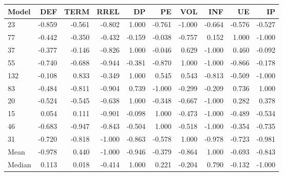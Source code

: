 \begin{table}
\centering
\label{tab:Shapley_loss_standardised_10_50}
\begin{tabular}{lrrrrrrrrr}
\toprule
 Model &    DEF &   TERM &   RREL &     DP &     PE &    VOL &    INF &     UE &     IP \\
\midrule
    23 & -0.859 & -0.561 & -0.802 &  1.000 & -0.761 & -1.000 & -0.664 & -0.576 & -0.527 \\
    77 & -0.442 & -0.350 & -0.432 & -0.159 & -0.038 & -0.757 &  0.152 &  1.000 & -1.000 \\
    37 & -0.377 & -0.146 & -0.826 &  1.000 & -0.046 &  0.629 & -1.000 &  0.460 & -0.092 \\
    55 & -0.740 & -0.688 & -0.944 & -0.381 & -0.870 &  1.000 & -1.000 & -0.866 & -0.178 \\
   132 & -0.108 &  0.833 & -0.349 &  1.000 &  0.545 &  0.543 & -0.813 & -0.509 & -1.000 \\
    83 & -0.484 & -0.811 & -0.904 &  0.739 & -1.000 & -0.299 & -0.209 &  0.736 &  1.000 \\
    20 & -0.524 & -0.545 & -0.638 &  1.000 & -0.348 & -0.667 & -1.000 &  0.282 &  0.378 \\
    15 &  0.054 &  0.111 & -0.901 & -0.098 &  1.000 & -0.473 & -1.000 & -0.489 & -0.534 \\
    46 & -0.683 & -0.947 & -0.843 & -0.504 &  1.000 & -0.518 & -1.000 & -0.354 & -0.735 \\
    31 & -0.720 & -0.818 & -1.000 & -0.863 & -0.578 &  1.000 & -0.978 & -0.723 & -0.981 \\
  Mean & -0.978 &  0.440 & -1.000 & -0.946 & -0.379 & -0.864 &  1.000 & -0.693 & -0.843 \\
Median &  0.113 &  0.018 & -0.414 &  1.000 &  0.221 & -0.204 &  0.790 & -0.132 & -1.000 \\
\bottomrule
\end{tabular}
\end{table}
